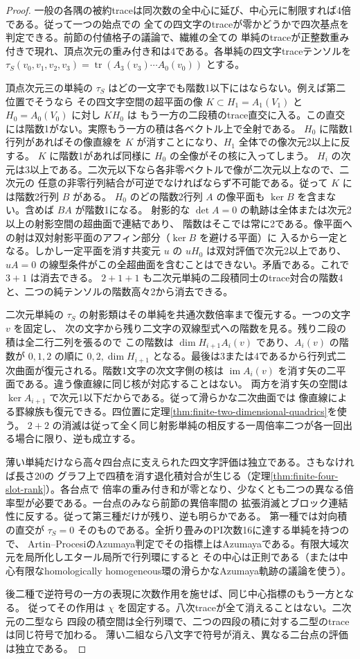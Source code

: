 \begin{proof}
一般の各隅の被約traceは同次数の全中心に延び、中心元に制限すれば4倍である。従って一つの始点での
全ての四文字のtraceが零かどうかで四次基点を判定できる。前節の付値格子の議論で、繊維の全ての
単純のtraceが正整数重み付きで現れ、頂点次元の重み付き和は4である。各単純の四文字traceテンソルを
$\tau_S(v_0,v_1,v_2,v_3)=\operatorname{tr}(A_3(v_3)\cdots A_0(v_0))$ とする。

頂点次元三の単純の $\tau_S$ はどの一文字でも階数1以下にはならない。例えば第二位置でそうなら
その四文字空間の超平面の像 $K\subset H_1=A_1(V_1)$ と $H_0=A_0(V_0)$ に対し $KH_0$ は
もう一方の二段積のtrace直交に入る。この直交には階数1がない。実際もう一方の積は各ベクトル上で全射である。
$H_0$ に階数1行列があればその像直線を $K$ が消すことになり、$H_1$ 全体での像次元2以上に反する。
$K$ に階数1があれば同様に $H_0$ の全像がその核に入ってしまう。
$H_i$ の次元は3以上である。二次元以下なら各非零ベクトルで像が二次元以上なので、二次元の
任意の非零行列結合が可逆でなければならず不可能である。従って $K$ には階数2行列 $B$ がある。
$H_0$ のどの階数2行列 $A$ の像平面も $\ker B$ を含まない。含めば $BA$ が階数1になる。
射影的な $\det A=0$ の軌跡は全体または次元2以上の射影空間の超曲面で連結であり、
階数はそこでは常に2である。像平面への射は双対射影平面のアフィン部分（$\ker B$ を避ける平面）に
入るから一定となる。しかし一定平面を消す共変元 $u$ の $uH_0$ は双対評価で次元2以上であり、
$uA=0$ の線型条件がこの全超曲面を含むことはできない。矛盾である。これで $3+1$ は消去できる。
$2+1+1$ も二次元単純の二段積同士のtrace対合の階数4と、二つの純テンソルの階数高々2から消去できる。

二次元単純の $\tau_S$ の射影類はその単純を共通次数倍率まで復元する。一つの文字 $v$ を固定し、
次の文字から残り二文字の双線型式への階数を見る。残り二段の積は全二行二列を張るので
この階数は $\dim H_{i+1}A_i(v)$ であり、$A_i(v)$ の階数が $0,1,2$ の順に $0,2,\dim H_{i+1}$
となる。最後は3または4であるから行列式二次曲面が復元される。階数1文字の次文字側の核は
$\operatorname{im}A_i(v)$ を消す矢の二平面である。違う像直線に同じ核が対応することはない。
両方を消す矢の空間は $\ker A_{i+1}$ で次元1以下だからである。従って滑らかな二次曲面では
像直線による罫線族も復元できる。四位置に定理\ref{thm:finite-two-dimensional-quadrics}を使う。
$2+2$ の消滅は従って全く同じ射影単純の相反する一周倍率二つが各一回出る場合に限り、逆も成立する。

薄い単純だけなら高々四台点に支えられた四文字評価は独立である。さもなければ長さ20の
グラフ上で四積を消す退化積対合が生じる（定理\ref{thm:finite-four-slot-rank}）。各台点で
倍率の重み付き和が零となり、少なくとも二つの異なる倍率型が必要である。一台点のみなら前節の異倍率間の
拡張消滅とブロック連結性に反する。従って第三種だけが残り、逆も明らかである。
第一種では対向積の直交が $\tau_S=0$ そのものである。全折り畳みのPI次数16に達する単純を持つので、
Artin--ProcesiのAzumaya判定でその指標上はAzumayaである。有限大域次元を局所化しエタール局所で行列環にすると
その中心は正則である（または中心有限なhomologically homogeneous環の滑らかなAzumaya軌跡の議論を使う）。

後二種で逆符号の一方の表現に次数作用を施せば、同じ中心指標のもう一方となる。
従ってその作用は $\chi$ を固定する。八次traceが全て消えることはない。二次元の二型なら
四段の積空間は全行列環で、二つの四段の積に対する二型のtraceは同じ符号で加わる。
薄い二組なら八文字で符号が消え、異なる二台点の評価は独立である。
\end{proof}

